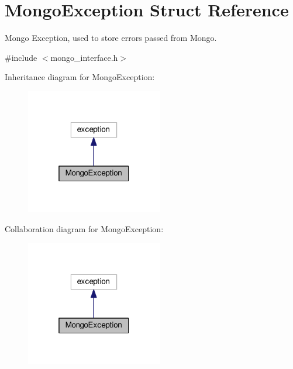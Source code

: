 \hypertarget{structMongoException}{}\section{Mongo\+Exception Struct Reference}
\label{structMongoException}


Mongo Exception, used to store errors passed from Mongo.  




{\ttfamily \#include $<$mongo\+\_\+interface.\+h$>$}



Inheritance diagram for Mongo\+Exception\+:\nopagebreak
\begin{figure}[H]
\begin{center}
\leavevmode
\includegraphics[width=169pt]{structMongoException__inherit__graph}
\end{center}
\end{figure}


Collaboration diagram for Mongo\+Exception\+:\nopagebreak
\begin{figure}[H]
\begin{center}
\leavevmode
\includegraphics[width=169pt]{structMongoException__coll__graph}
\end{center}
\end{figure}
